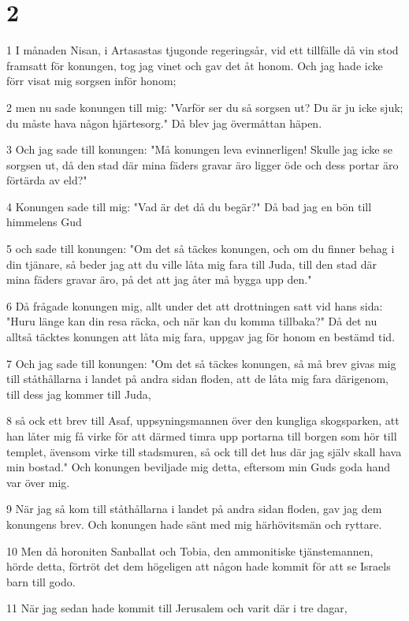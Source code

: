 \chapter{2}

\par 1 I månaden Nisan, i Artasastas tjugonde regeringsår, vid ett tillfälle då vin stod framsatt för konungen, tog jag vinet och gav det åt honom. Och jag hade icke förr visat mig sorgsen inför honom;
\par 2 men nu sade konungen till mig: "Varför ser du så sorgsen ut? Du är ju icke sjuk; du måste hava någon hjärtesorg." Då blev jag övermåttan häpen.
\par 3 Och jag sade till konungen: "Må konungen leva evinnerligen! Skulle jag icke se sorgsen ut, då den stad där mina fäders gravar äro ligger öde och dess portar äro förtärda av eld?"
\par 4 Konungen sade till mig: "Vad är det då du begär?" Då bad jag en bön till himmelens Gud
\par 5 och sade till konungen: "Om det så täckes konungen, och om du finner behag i din tjänare, så beder jag att du ville låta mig fara till Juda, till den stad där mina fäders gravar äro, på det att jag åter må bygga upp den."
\par 6 Då frågade konungen mig, allt under det att drottningen satt vid hans sida: "Huru länge kan din resa räcka, och när kan du komma tillbaka?" Då det nu alltså täcktes konungen att låta mig fara, uppgav jag för honom en bestämd tid.
\par 7 Och jag sade till konungen: "Om det så täckes konungen, så må brev givas mig till ståthållarna i landet på andra sidan floden, att de låta mig fara därigenom, till dess jag kommer till Juda,
\par 8 så ock ett brev till Asaf, uppsyningsmannen över den kungliga skogsparken, att han låter mig få virke för att därmed timra upp portarna till borgen som hör till templet, ävensom virke till stadsmuren, så ock till det hus där jag själv skall hava min bostad." Och konungen beviljade mig detta, eftersom min Guds goda hand var över mig.
\par 9 När jag så kom till ståthållarna i landet på andra sidan floden, gav jag dem konungens brev. Och konungen hade sänt med mig härhövitsmän och ryttare.
\par 10 Men då horoniten Sanballat och Tobia, den ammonitiske tjänstemannen, hörde detta, förtröt det dem högeligen att någon hade kommit för att se Israels barn till godo.
\par 11 När jag sedan hade kommit till Jerusalem och varit där i tre dagar,
